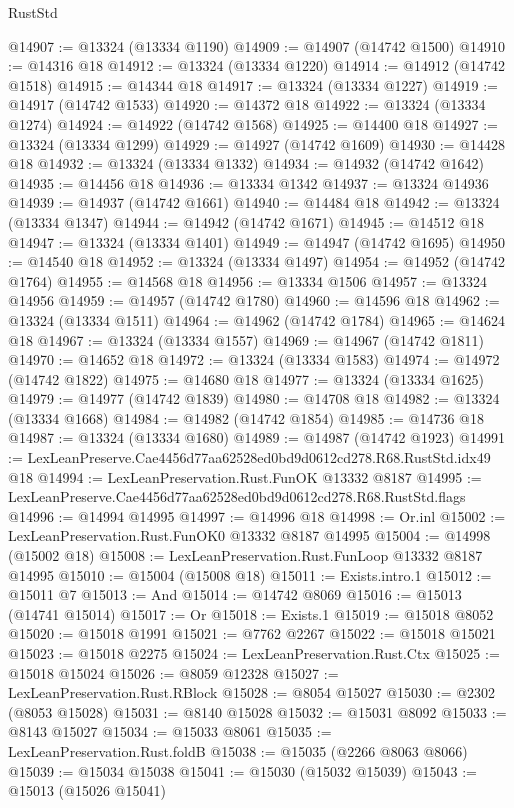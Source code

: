 \begin{lexlean}{RustStd}
\begin{coremodule}
@14907 := @13324 (@13334 @1190)
@14909 := @14907 (@14742 @1500)
@14910 := @14316 @18
@14912 := @13324 (@13334 @1220)
@14914 := @14912 (@14742 @1518)
@14915 := @14344 @18
@14917 := @13324 (@13334 @1227)
@14919 := @14917 (@14742 @1533)
@14920 := @14372 @18
@14922 := @13324 (@13334 @1274)
@14924 := @14922 (@14742 @1568)
@14925 := @14400 @18
@14927 := @13324 (@13334 @1299)
@14929 := @14927 (@14742 @1609)
@14930 := @14428 @18
@14932 := @13324 (@13334 @1332)
@14934 := @14932 (@14742 @1642)
@14935 := @14456 @18
@14936 := @13334 @1342
@14937 := @13324 @14936
@14939 := @14937 (@14742 @1661)
@14940 := @14484 @18
@14942 := @13324 (@13334 @1347)
@14944 := @14942 (@14742 @1671)
@14945 := @14512 @18
@14947 := @13324 (@13334 @1401)
@14949 := @14947 (@14742 @1695)
@14950 := @14540 @18
@14952 := @13324 (@13334 @1497)
@14954 := @14952 (@14742 @1764)
@14955 := @14568 @18
@14956 := @13334 @1506
@14957 := @13324 @14956
@14959 := @14957 (@14742 @1780)
@14960 := @14596 @18
@14962 := @13324 (@13334 @1511)
@14964 := @14962 (@14742 @1784)
@14965 := @14624 @18
@14967 := @13324 (@13334 @1557)
@14969 := @14967 (@14742 @1811)
@14970 := @14652 @18
@14972 := @13324 (@13334 @1583)
@14974 := @14972 (@14742 @1822)
@14975 := @14680 @18
@14977 := @13324 (@13334 @1625)
@14979 := @14977 (@14742 @1839)
@14980 := @14708 @18
@14982 := @13324 (@13334 @1668)
@14984 := @14982 (@14742 @1854)
@14985 := @14736 @18
@14987 := @13324 (@13334 @1680)
@14989 := @14987 (@14742 @1923)
@14991 := LexLeanPreserve.Cae4456d77aa62528ed0bd9d0612cd278.R68.RustStd.idx49 @18
@14994 := LexLeanPreservation.Rust.FunOK @13332 @8187
@14995 := LexLeanPreserve.Cae4456d77aa62528ed0bd9d0612cd278.R68.RustStd.flags
@14996 := @14994 @14995
@14997 := @14996 @18
@14998 := Or.inl
@15002 := LexLeanPreservation.Rust.FunOK0 @13332 @8187 @14995
@15004 := @14998 (@15002 @18)
@15008 := LexLeanPreservation.Rust.FunLoop @13332 @8187 @14995
@15010 := @15004 (@15008 @18)
@15011 := Exists.intro.{1}
@15012 := @15011 @7
@15013 := And
@15014 := @14742 @8069
@15016 := @15013 (@14741 @15014)
@15017 := Or
@15018 := Exists.{1}
@15019 := @15018 @8052
@15020 := @15018 @1991
@15021 := @7762 @2267
@15022 := @15018 @15021
@15023 := @15018 @2275
@15024 := LexLeanPreservation.Rust.Ctx
@15025 := @15018 @15024
@15026 := @8059 @12328
@15027 := LexLeanPreservation.Rust.RBlock
@15028 := @8054 @15027
@15030 := @2302 (@8053 @15028)
@15031 := @8140 @15028
@15032 := @15031 @8092
@15033 := @8143 @15027
@15034 := @15033 @8061
@15035 := LexLeanPreservation.Rust.foldB
@15038 := @15035 (@2266 @8063 @8066)
@15039 := @15034 @15038
@15041 := @15030 (@15032 @15039)
@15043 := @15013 (@15026 @15041)

\end{coremodule}
\end{lexlean}
